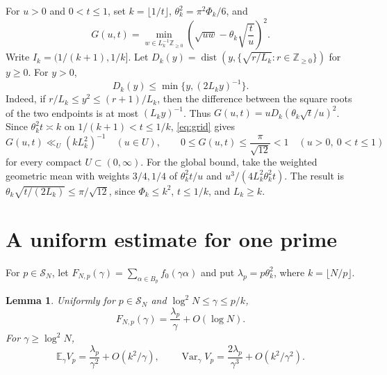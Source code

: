 \documentclass[11pt]{amsart}
\newtheorem{lemma}[theorem]{Lemma}
\theoremstyle{remark}
\DeclareMathOperator{\Var}{Var}
\DeclareMathOperator{\dist}{dist}
\newcommand{\Ee}{\mathbb E}
\newcommand{\Z}{\mathbb Z}
\begin{document}
For \(u>0\) and \(0<t\le1\), set \(k=\lfloor 1/t\rfloor\), \(\theta_k^2=\pi^2\Phi_k/6\), and
\begin{equation}
 G(u,t)=\min_{w\in L_k^{-1}\Z_{\ge0}}
 \left(\sqrt{uw}-\theta_k\sqrt{\frac{t}{u}}\right)^2.
 \label{eq:G}
\end{equation}
Write \(I_k=(1/(k+1),1/k]\). Let \(D_k(y)=\dist(y,\{\sqrt{r/L_k}:r\in\Z_{\ge0}\})\) for \(y\ge0\). For \(y>0\),
\begin{equation}
 D_k(y)\le \min\{y,(2L_k y)^{-1}\}.
 \label{eq:grid}
\end{equation}
Indeed, if \(r/L_k\le y^2\le(r+1)/L_k\), then the difference between the square roots of the two endpoints is at most \((L_k y)^{-1}\). Thus \(G(u,t)=uD_k(\theta_k\sqrt t/u)^2\). Since \(\theta_k^2t\asymp k\) on \(1/(k+1)<t\le1/k\), \eqref{eq:grid} gives
\begin{equation}
 G(u,t)\ll_U (kL_k^2)^{-1}\quad(u\in U),\qquad
 0\le G(u,t)\le\frac{\pi}{\sqrt{12}}<1\quad(u>0,\ 0<t\le1)
 \label{eq:G-bounds}
\end{equation}
for every compact \(U\subset(0,\infty)\). For the global bound, take the weighted geometric mean with weights \(3/4,1/4\) of \(\theta_k^2 t/u\) and \(u^3/(4L_k^2\theta_k^2t)\). The result is \(\theta_k\sqrt{t/(2L_k)}\le\pi/\sqrt{12}\), since \(\Phi_k\le k^2\), \(t\le1/k\), and \(L_k\ge k\).

\section{A uniform estimate for one prime}
\label{sec:block-estimate}

For \(p\in\mathcal S_N\), let \(F_{N,p}(\gamma)=\sum_{\alpha\in B_p} f_0(\gamma\alpha)\) and put \(\lambda_p=p\theta_k^2\), where \(k=\lfloor N/p\rfloor\).

\begin{lemma}
\label{lem:block-energy}
Uniformly for \(p\in\mathcal S_N\) and \(\log^2 N\le\gamma\le p/k\),
\begin{equation}
 F_{N,p}(\gamma)=\frac{\lambda_p}{\gamma}+O(\log N).
 \label{eq:block-energy}
\end{equation}
For \(\gamma\ge\log^2N\),
\begin{equation}
 \Ee_\gamma V_p=\frac{\lambda_p}{\gamma^2}+O(k^2/\gamma),\qquad
 \Var_\gamma V_p=\frac{2\lambda_p}{\gamma^3}+O(k^2/\gamma^2).
 \label{eq:block-moments}
\end{equation}
\end{lemma}
\end{document}
